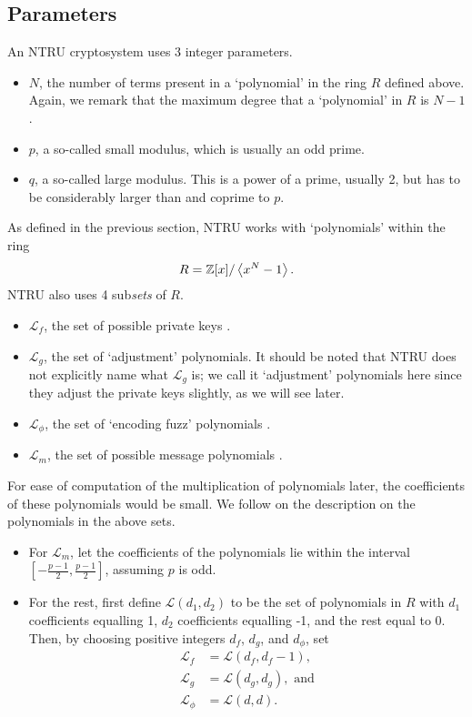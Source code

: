 \subsection{Parameters}
An NTRU cryptosystem uses 3 integer parameters.
\begin{itemize}
    \item $N$, the number of terms present in a `polynomial' in the ring $R$ defined above. Again, we remark that the maximum degree that a `polynomial' in $R$ is $N - 1$.
    \item $p$, a so-called small modulus, which is usually an odd prime.
    \item $q$, a so-called large modulus. This is a power of a prime, usually 2, but has to be considerably larger than and coprime to $p$.
\end{itemize}

As defined in the previous section, NTRU works with `polynomials' within the ring
\[
    R = \mathbb{Z}[x] / \left\langle x^N - 1\right\rangle.
\]
NTRU also uses 4 sub\textit{sets} of $R$.
\begin{itemize}
    \item $\mathcal{L}_f$, the set of possible private keys \cite[\S 1.2]{hoffstein_pipher_silverman_1998}.
    \item $\mathcal{L}_g$, the set of `adjustment' polynomials. It should be noted that NTRU does not explicitly name what $\mathcal{L}_g$ is; we call it `adjustment' polynomials here since they adjust the private keys slightly, as we will see later.
    \item $\mathcal{L}_\phi$, the set of `encoding fuzz' polynomials \cite[\S 1.3]{hoffstein_pipher_silverman_1996}.
    \item $\mathcal{L}_m$, the set of possible message polynomials \cite[\S 1.3]{hoffstein_pipher_silverman_1998}.
\end{itemize}

For ease of computation of the multiplication of polynomials later, the coefficients of these polynomials would be small. We follow \cite[\S~2.2]{hoffstein_pipher_silverman_1998} on the description on the polynomials in the above sets.
\begin{itemize}
    \item For $\mathcal{L}_m$, let the coefficients of the polynomials lie within the interval $\left[-\frac{p-1}2, \frac{p-1}2\right]$, assuming $p$ is odd.
    \item For the rest, first define $\mathcal{L}(d_1, d_2)$ to be the set of polynomials in $R$ with $d_1$ coefficients equalling 1, $d_2$ coefficients equalling -1, and the rest equal to 0. Then, by choosing positive integers $d_f$, $d_g$, and $d_\phi$, set
    \begin{align*}
        \mathcal{L}_f &= \mathcal{L}(d_f, d_f-1),\\
        \mathcal{L}_g &= \mathcal{L}(d_g, d_g), \text{ and}\\
        \mathcal{L}_\phi &= \mathcal{L}(d, d).
    \end{align*}
\end{itemize}

